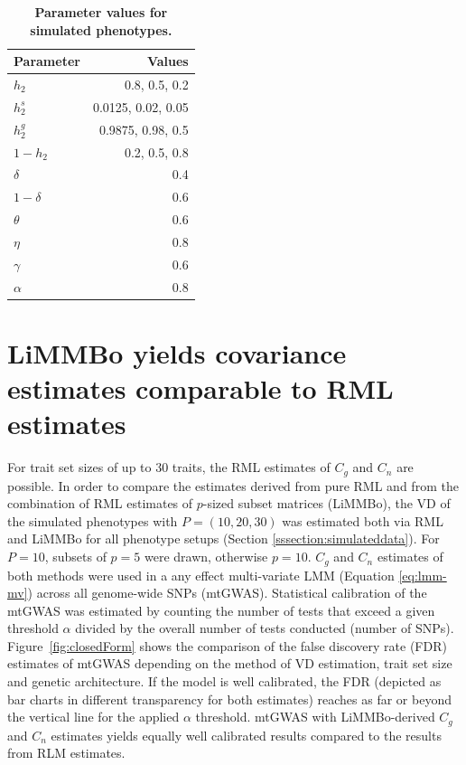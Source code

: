 \begin{table}[htbp]
  \caption{\textbf{Parameter values for simulated phenotypes.}}
  \centering
    \begin{tabular}{lr}
     \toprule
    Parameter & \multicolumn{1}{r}{Values} \\
     \midrule
    \(h_2\) & \multicolumn{1}{r}{0.8, 0.5, 0.2} \\
    \(h_2^s\) & \multicolumn{1}{r}{0.0125, 0.02, 0.05} \\
    \(h_2^g\) & \multicolumn{1}{r}{0.9875, 0.98, 0.5} \\
    \(1- h_2\) & \multicolumn{1}{r}{0.2, 0.5, 0.8} \\
    \(\delta\) & 0.4 \\
    \(1- \delta\) & 0.6 \\
    \(\theta\) & 0.6 \\
    \(\eta\) & 0.8 \\
    \(\gamma\) & 0.6 \\
    \(\alpha\) & 0.8 \\
  
    \bottomrule
    \end{tabular}%
  \label{tab:parvalues}%
\end{table}%



 



 \section{LiMMBo yields covariance estimates comparable to RML estimates}
For trait set sizes of up to 30 traits, the RML estimates of  $C_g$ and $C_n$ are possible. In order to compare the estimates derived from pure RML and from the combination of RML estimates of \(p\)-sized subset matrices (LiMMBo), the VD of the simulated phenotypes with \(P=(10,20,30)\) was estimated both via RML and LiMMBo for all phenotype setups (Section \ref{sssection:simulateddata}).  For \(P=10\), subsets of \(p=5\) were drawn, otherwise \(p=10\). $C_g$ and $C_n$ estimates of both methods were used in a any effect multi-variate LMM (Equation \ref{eq:lmm-mv}) across all genome-wide SNPs (mtGWAS). Statistical calibration of the mtGWAS was estimated by counting the number of tests that exceed a given threshold \(\alpha\) divided by the overall number of tests conducted (number of SNPs). Figure~\ref{fig:closedForm} shows the comparison of the false discovery rate (FDR) estimates of mtGWAS depending on the method of VD estimation, trait set size and genetic architecture. If the model is well calibrated, the FDR (depicted as bar charts in different transparency for both estimates) reaches as far or beyond the vertical line for the applied \(\alpha\) threshold. mtGWAS with LiMMBo-derived \(C_g\) and \(C_n\) estimates yields equally well calibrated results compared to the results from RLM estimates.

